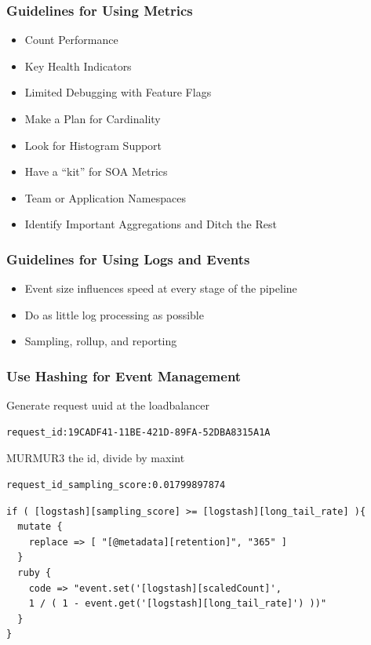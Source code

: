 \begin{frame}
    \frametitle{Guidelines for Using Metrics}

    \begin{itemize}
        \item Count Performance
        \item Key Health Indicators
        \item Limited Debugging with Feature Flags
        \item Make a Plan for Cardinality
        \item Look for Histogram Support
        \item Have a ``kit'' for SOA Metrics
        \item Team or Application Namespaces
        \item Identify Important Aggregations and Ditch the Rest
    \end{itemize}
\end{frame}

\begin{frame}
    \frametitle{Guidelines for Using Logs and Events}
    \begin{itemize}
        \item Event size influences speed at every stage of the pipeline
        \item Do as little log processing as possible
        \item Sampling, rollup, and reporting
    \end{itemize}
\end{frame}

\begin{frame}[fragile]
    \frametitle{Use Hashing for Event Management}

    Generate request uuid at the loadbalancer
    \begin{lstlisting}
request_id:19CADF41-11BE-421D-89FA-52DBA8315A1A
    \end{lstlisting}

    MURMUR3 the id, divide by maxint
    \begin{lstlisting}
request_id_sampling_score:0.01799897874
    \end{lstlisting}

    \begin{lstlisting}
if ( [logstash][sampling_score] >= [logstash][long_tail_rate] ){
  mutate {
    replace => [ "[@metadata][retention]", "365" ]
  }
  ruby {
    code => "event.set('[logstash][scaledCount]',
    1 / ( 1 - event.get('[logstash][long_tail_rate]') ))"
  }
}
\end{lstlisting}
\end{frame}

